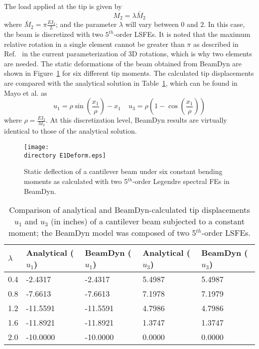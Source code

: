 The load applied at the tip is given by 
\begin{equation}
    \label{E1Load}
    M_2 = \lambda \bar{M}_2
\end{equation}
where $\bar{M}_2 = \pi \frac{EI_2}{L}$; and the parameter $\lambda$ will vary between $0$ and $2$. In 
this case, the beam is discretized with two $5^{th}$-order LSFEs. It is noted that the maximum relative rotation in a single element cannot be greater than $\pi$ as described in Ref.~\cite{Bauchau-etal:2008} in the current parameterization of 3D rotations, which is why two elements are needed. The static deformations of the beam obtained from BeamDyn are shown in
Figure~\ref{E1Deform} for six different tip moments.
The calculated tip displacements are compared with the analytical solution
in Table~\ref{E1u},
which can be found in Mayo et al.\cite{Mayo-etal:2004} as
\begin{equation}
    \label{E1Analytical}
    u_1 = \rho \sin \left( \frac{x_1}{\rho} \right) - x_1~~~~~u_3 = \rho
\left(1-\cos\left(\frac{x_1}{\rho}\right) \right)
\end{equation}
where $\rho = \frac{EI_2}{M_2}$. At this discretization level, BeamDyn results are virtually
identical to those of the analytical solution.

\begin{figure}
    \centering
    \texttt{[image: \\directory E1Deform.eps]}

    \caption{Static deflection of a cantilever beam under six constant
bending moments as calculated with two 5$^{th}$-order Legendre spectral
FEs in BeamDyn.}

    \label{E1Deform}
\end{figure}

\begin{table}[tbp]
\centering \caption{Comparison of analytical and BeamDyn-calculated tip
displacements $u_1$ and $u_3$ (in inches) of a cantilever beam subjected to a constant moment; the BeamDyn model was composed of two 5$^{th}$-order LSFEs.}
\label{E1u} 
	\begin{tabular}{| l | l | l | l | l | }
    	\hline
    	$\lambda$ & Analytical ($u_1$) & BeamDyn ($u_1$) & Analytical ($u_3$) & BeamDyn ($u_3$)  
	\\ \hline
    	0.4       & -2.4317    & -2.4317  & 5.4987     & 5.4987
	\\ \hline
    	0.8       & -7.6613    & -7.6613  & 7.1978     & 7.1979
	\\ \hline
    	1.2       & -11.5591   & -11.5591 & 4.7986     & 4.7986
	\\ \hline
    	1.6       & -11.8921   & -11.8921 & 1.3747     & 1.3747
	\\ \hline
    	2.0       & -10.0000   & -10.0000 & 0.0000     & 0.0000
	\\ \hline
    \end{tabular}
\end{table}

